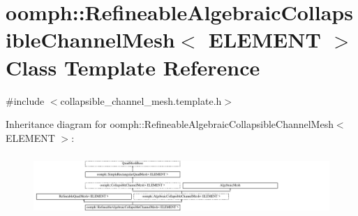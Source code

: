 \hypertarget{classoomph_1_1RefineableAlgebraicCollapsibleChannelMesh}{}\section{oomph\+:\+:Refineable\+Algebraic\+Collapsible\+Channel\+Mesh$<$ E\+L\+E\+M\+E\+NT $>$ Class Template Reference}
\label{classoomph_1_1RefineableAlgebraicCollapsibleChannelMesh}


{\ttfamily \#include $<$collapsible\+\_\+channel\+\_\+mesh.\+template.\+h$>$}

Inheritance diagram for oomph\+:\+:Refineable\+Algebraic\+Collapsible\+Channel\+Mesh$<$ E\+L\+E\+M\+E\+NT $>$\+:\begin{figure}[H]
\begin{center}
\leavevmode
\includegraphics[height=2.333333cm]{classoomph_1_1RefineableAlgebraicCollapsibleChannelMesh}
\end{center}
\end{figure}
